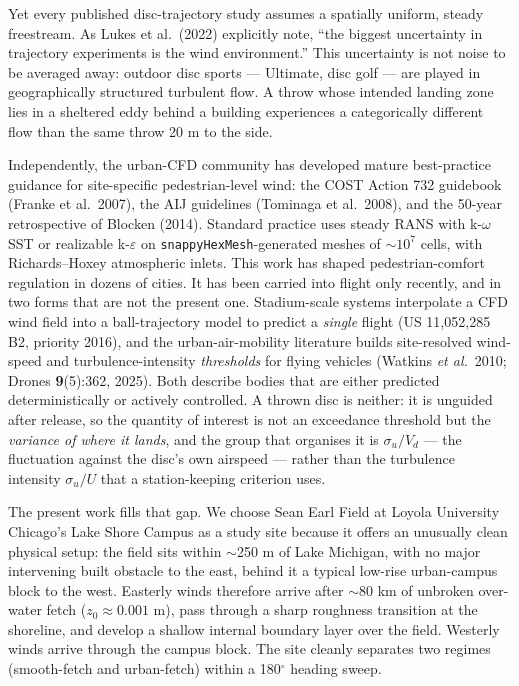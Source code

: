 \documentclass[11pt,letterpaper]{article}
\begin{document}
Yet every published disc-trajectory study assumes a spatially uniform, steady freestream. As Lukes et al.\ (2022) explicitly note, ``the biggest uncertainty in trajectory experiments is the wind environment.'' This uncertainty is not noise to be averaged away: outdoor disc sports --- Ultimate, disc golf --- are played in geographically structured turbulent flow. A throw whose intended landing zone lies in a sheltered eddy behind a building experiences a categorically different flow than the same throw 20 m to the side.

Independently, the urban-CFD community has developed mature best-practice guidance for site-specific pedestrian-level wind: the COST Action 732 guidebook (Franke et al.\ 2007), the AIJ guidelines (Tominaga et al.\ 2008), and the 50-year retrospective of Blocken (2014). Standard practice uses steady RANS with k-$\omega$ SST or realizable k-$\varepsilon$ on \texttt{snappyHexMesh}-generated meshes of $\sim 10^7$ cells, with Richards--Hoxey atmospheric inlets. %
This work has shaped pedestrian-comfort regulation in dozens of cities. It has been carried into flight only recently, and in two forms that are not the present one. Stadium-scale systems interpolate a CFD wind field into a ball-trajectory model to predict a \emph{single} flight (US 11{,}052{,}285 B2, priority 2016), and the urban-air-mobility literature builds site-resolved wind-speed and turbulence-intensity \emph{thresholds} for flying vehicles (Watkins \emph{et al.}\ 2010; Drones \textbf{9}(5):362, 2025). Both describe bodies that are either predicted deterministically or actively controlled. A thrown disc is neither: it is unguided after release, so the quantity of interest is not an exceedance threshold but the \emph{variance of where it lands}, and the group that organises it is $\sigma_u/V_d$ --- the fluctuation against the disc's own airspeed --- rather than the turbulence intensity $\sigma_u/U$ that a station-keeping criterion uses.

The present work fills that gap. We choose Sean Earl Field at Loyola University Chicago's Lake Shore Campus as a study site because it offers an unusually clean physical setup: the field sits within $\sim$250 m of Lake Michigan, with no major intervening built obstacle to the east, behind it a typical low-rise urban-campus block to the west. Easterly winds therefore arrive after $\sim$80 km of unbroken over-water fetch ($z_0 \approx 0.001$ m), pass through a sharp roughness transition at the shoreline, and develop a shallow internal boundary layer over the field. Westerly winds arrive through the campus block. The site cleanly separates two regimes (smooth-fetch and urban-fetch) within a 180$^\circ$ heading sweep.
\end{document}
